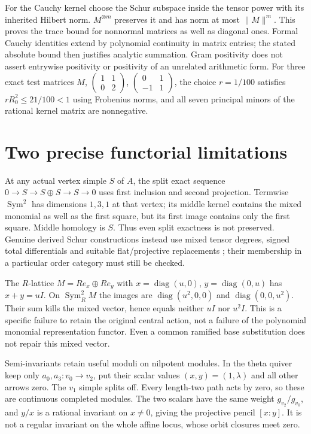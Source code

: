\documentclass[11pt,oneside,openany]{book}
\theoremstyle{definition}\newtheorem{definition}[theorem]{Definition}
\theoremstyle{remark}\newtheorem{remark}[theorem]{Remark}
\begin{document}
For the Cauchy kernel choose the Schur subspace inside the tensor power with its inherited Hilbert norm. $M^{\otimes m}$ preserves it and has norm at most $\|M\|^m$. This proves the trace bound for nonnormal matrices as well as diagonal ones. Formal Cauchy identities extend by polynomial continuity in matrix entries; the stated absolute bound then justifies analytic summation. Gram positivity does not assert entrywise positivity or positivity of an unrelated arithmetic form. For three exact test matrices $M$, $\left(\begin{smallmatrix}1&1\\0&2\end{smallmatrix}\right)$, $\left(\begin{smallmatrix}0&1\\-1&1\end{smallmatrix}\right)$, the choice $r=1/100$ satisfies $rR_0^2\le21/100<1$ using Frobenius norms, and all seven principal minors of the rational kernel matrix are nonnegative.

\section{Two precise functorial limitations}
At any actual vertex simple $S$ of $A$, the split exact sequence $0\to S\to S\oplus S\to S\to0$ uses first inclusion and second projection. Termwise $\operatorname{Sym}^2$ has dimensions $1,3,1$ at that vertex; its middle kernel contains the mixed monomial as well as the first square, but its first image contains only the first square. Middle homology is $S$. Thus even split exactness is not preserved. Genuine derived Schur constructions instead use mixed tensor degrees, signed total differentials and suitable flat/projective replacements \cite{SchurComplexes,DerivedSchur}; their membership in a particular order category must still be checked.

The $R$-lattice $M=R e_x\oplus R e_y$ with $x=\operatorname{diag}(u,0)$, $y=\operatorname{diag}(0,u)$ has $x+y=uI$. On $\operatorname{Sym}^2_RM$ the images are $\operatorname{diag}(u^2,0,0)$ and $\operatorname{diag}(0,0,u^2)$. Their sum kills the mixed vector, hence equals neither $uI$ nor $u^2I$. This is a specific failure to retain the original central action, not a failure of the polynomial monomial representation functor. Even a common ramified base substitution does not repair this mixed vector.

Semi-invariants retain useful moduli on nilpotent modules. In the theta quiver keep only $a_0,a_3:v_0\to v_2$, put their scalar values $(x,y)=(1,\lambda)$ and all other arrows zero. The $v_1$ simple splits off. Every length-two path acts by zero, so these are continuous completed modules. The two scalars have the same weight $g_{v_2}/g_{v_0}$, and $y/x$ is a rational invariant on $x\ne0$, giving the projective pencil $[x:y]$. It is not a regular invariant on the whole affine locus, whose orbit closures meet zero.
\end{document}
